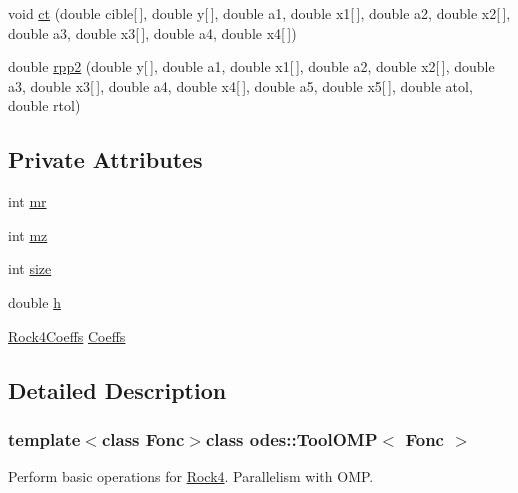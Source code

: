 \begin{DoxyCompactItemize}
\item 
void \hyperlink{classodes_1_1ToolOMP_ac6185a8312b7d7d0d8828431de643b82}{ct} (double cible\mbox{[}$\,$\mbox{]}, double y\mbox{[}$\,$\mbox{]}, double a1, double x1\mbox{[}$\,$\mbox{]}, double a2, double x2\mbox{[}$\,$\mbox{]}, double a3, double x3\mbox{[}$\,$\mbox{]}, double a4, double x4\mbox{[}$\,$\mbox{]})
\item 
double \hyperlink{classodes_1_1ToolOMP_ad280b1349eb073970b52ca6de7fc6a8b}{rpp2} (double y\mbox{[}$\,$\mbox{]}, double a1, double x1\mbox{[}$\,$\mbox{]}, double a2, double x2\mbox{[}$\,$\mbox{]}, double a3, double x3\mbox{[}$\,$\mbox{]}, double a4, double x4\mbox{[}$\,$\mbox{]}, double a5, double x5\mbox{[}$\,$\mbox{]}, double atol, double rtol)
\end{DoxyCompactItemize}
\subsection*{Private Attributes}
\begin{DoxyCompactItemize}
\item 
int \hyperlink{classodes_1_1ToolOMP_a180f1b861084da81f226c7269842c217}{mr}
\item 
int \hyperlink{classodes_1_1ToolOMP_af3db3c17d4cfe49f75e991dc1ccf86a5}{mz}
\item 
int \hyperlink{classodes_1_1ToolOMP_a9bdc5154c32b69a72ef1fc61f738da94}{size}
\item 
double \hyperlink{classodes_1_1ToolOMP_a92423a40e96da1f9a7dba2d23b1c5d8b}{h}
\item 
\hyperlink{structodes_1_1Rock4Coeffs}{Rock4\-Coeffs} \hyperlink{classodes_1_1ToolOMP_ad62a277a73cf51a49c1aa6cfac41e863}{Coeffs}
\end{DoxyCompactItemize}


\subsection{Detailed Description}
\subsubsection*{template$<$class Fonc$>$class odes\-::\-Tool\-O\-M\-P$<$ Fonc $>$}

Perform basic operations for \hyperlink{classodes_1_1Rock4}{Rock4}. Parallelism with O\-M\-P. 

